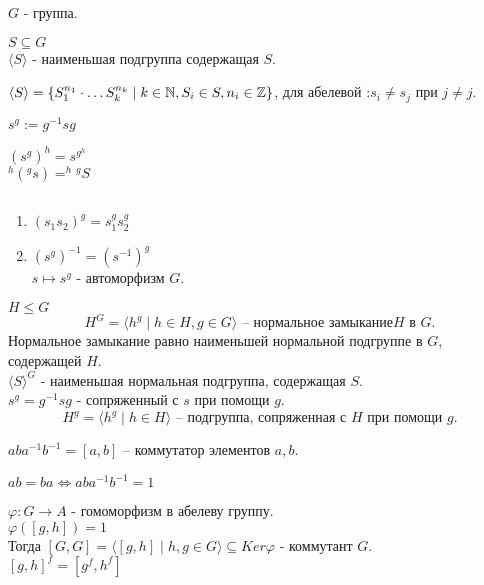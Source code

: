 \documentclass[12pt]{report}
\begin{document}
$G$ - группа.
\begin{defn}
    $S \subseteq G$ \\
    $\langle S \rangle$ - наименьшая подгруппа содержащая $S$. 
\end{defn}
\begin{st}
    $\langle S \rangle = \{S_1 ^{n_1}\cdot \ldots  S_k^{n_k}\mid k \in  \mathbb{N} , S_i \in  S, n_i \in  \mathbb{Z}\}$, для абелевой :$s_i \ne s_j$ при $j \ne j$.
\end{st}
\begin{defn}
    $s ^g := g^{-1} s g$
\end{defn}
\begin{note}
    $(s^g)^h = s^{g^h}$\\
    $^h\!(^g\!s) = ^h\!^g\!S$
\end{note}
\begin{prop}$ $
    \begin{enumerate}
	\item $(s_1 s_2)^g = s_1 ^g s_2 ^g$ 
	\item $(s^g)^{-1} = (s^{-1})^g$\\
	    $s \mapsto s^g$ - автоморфизм $G $.
    \end{enumerate}
\end{prop}
\begin{defn}
    $H \le G$ 
    \[
	H^G = \langle h^g \mid h \in  H, g \in  G \rangle  \mbox{ -- нормальное замыкание} H \mbox{ в } G
    .\]  
    Нормальное замыкание равно наименьшей нормальной подгруппе в $G$, содержащей $H$.\\
    $\langle S \rangle ^G$ - наименьшая нормальная подгруппа, содержащая $S$.\\
    $s^g= g^{-1} s g$  - сопряженный с $s$ при помощи $g$.\\
    \[
	H^g=\langle h^g \mid h \in  H\rangle \mbox{ -- подгруппа, сопряженная с $H$ при помощи $g$}
    .\] 
\end{defn}
\begin{defn}
    $aba^{-1}b^{-1} = [a, b] $ -- коммутатор элементов $a, b$.
\end{defn}
\begin{note}
    $ab = ba \Leftrightarrow aba^{-1}b^{-1} = 1$\\
\end{note}
\begin{st}
    $\varphi  : G \to A$ - гомоморфизм в абелеву группу.\\
    $\varphi([g, h]) = 1$ \\
    Тогда $[G, G] = \langle [g, h]\mid h, g \in  G \rangle \subseteq Ker \varphi $ - коммутант $G$. \\
    $[g, h] ^f = [g^f , h^f]$
\end{st}
\end{document}

